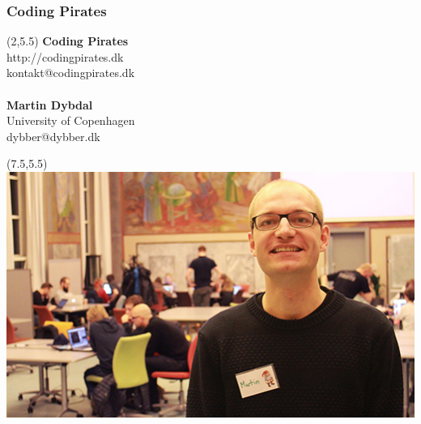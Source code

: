 \documentclass{beamer}
\begin{document}
\begin{frame}
\frametitle{Coding Pirates}

\begin{textblock}{15}(2,5.5)
\textbf{Coding Pirates}\\
http://codingpirates.dk\\
kontakt@codingpirates.dk\\ ~
\\
\textbf{Martin Dybdal}\\
University of Copenhagen\\
dybber@dybber.dk\\
\end{textblock}


\begin{textblock}{7}(7.5,5.5)
\includegraphics[width=\textwidth]{imagery/martin}
\end{textblock}


\end{frame}
\end{document}

